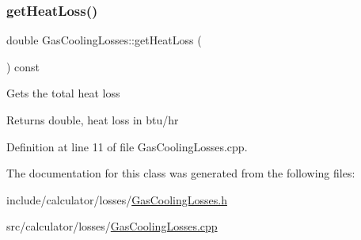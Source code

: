 \subsubsection{\texorpdfstring{get\+Heat\+Loss()}{getHeatLoss()}}
{\footnotesize\ttfamily double Gas\+Cooling\+Losses\+::get\+Heat\+Loss (\begin{DoxyParamCaption}{ }\end{DoxyParamCaption}) const}

Gets the total heat loss

\begin{DoxyReturn}{Returns}
double, heat loss in btu/hr 
\end{DoxyReturn}


Definition at line 11 of file Gas\+Cooling\+Losses.\+cpp.



The documentation for this class was generated from the following files\+:\begin{DoxyCompactItemize}
\item 
include/calculator/losses/\hyperlink{_gas_cooling_losses_8h}{Gas\+Cooling\+Losses.\+h}\item 
src/calculator/losses/\hyperlink{_gas_cooling_losses_8cpp}{Gas\+Cooling\+Losses.\+cpp}\end{DoxyCompactItemize}
